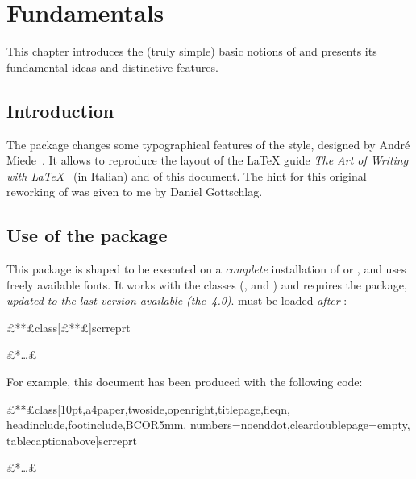 \chapter{Fundamentals}
\label{chp:fundamentals}

This chapter introduces the (truly simple) basic notions of \arsclassica{} and presents its fundamental ideas and distinctive features.


\section{Introduction}

The \arsclassica{} package changes some typographical features of the \classicthesis{} style, designed by Andr\'e Miede~\citep{miede:classicthesis,pantieri:classicthesis}. It allows to reproduce the layout of the \LaTeX{} guide \emph{The Art of Writing with \LaTeX}~\citep{pantieri:art} (in Italian) and of this document. The hint for this original reworking of \classicthesis{} was given to me by Daniel Gottschlag.



\section{Use of the package}

This package is shaped to be executed on a \emph{complete} installation of \miktex{} or \texlive, and uses freely available fonts.
It works with the  classes (,  and ) and requires the  package, \emph{updated to the last version available (the~4.0)}. \arsclassica{} must be loaded \emph{after} :
\begin{code}
\document£**£class[£*\meta{\dots\unkern}*£]{scrreprt} %

\usepackage[£*\meta{\dots\unkern}*£]{classicthesis}
\usepackage{arsclassica}


£*\dots*£

\end{code}

For example, this document has been produced with the following code:
\begin{code}
\document£**£class[10pt,a4paper,twoside,openright,titlepage,fleqn,%
               headinclude,footinclude,BCOR5mm,%
               numbers=noenddot,cleardoublepage=empty,%
               tablecaptionabove]{scrreprt}

\usepackage{£*\meta{\dots\unkern}*£}
\usepackage{subfig}
\usepackage[eulerchapternumbers,subfig,beramono,%
            eulermath,pdfspacing]{classicthesis}
\usepackage{arsclassica}


£*\dots*£

\end{code}

